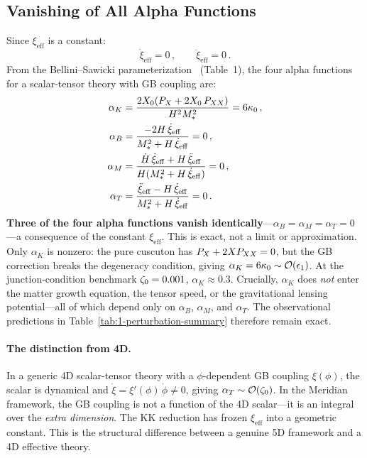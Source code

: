 \subsection{Vanishing of All Alpha Functions}
\label{sec:1-alphaT-vanish}

Since $\xi_{\mathrm{eff}}$ is a constant:
\begin{equation}
\label{eq:1-xi-derivatives}
\dot{\xi}_{\mathrm{eff}} = 0\,, \qquad \ddot{\xi}_{\mathrm{eff}} = 0\,.
\end{equation}
From the Bellini--Sawicki parameterization~\cite{ch1:bellini-sawicki} (Table~1), the four alpha functions for a scalar-tensor theory with GB coupling are:
\begin{subequations}
\label{eq:1-alphas-all}
\begin{align}
\alpha_K &= \frac{2X_0(P_X + 2X_0\,P_{XX})}{H^2 M_*^2} = 6\kappa_0\,, \label{eq:1-alphaK}\\
\alpha_B &= \frac{-2H\,\dot{\xi}_{\mathrm{eff}}}{M_*^2 + H\,\dot{\xi}_{\mathrm{eff}}} = 0\,, \label{eq:1-alphaB}\\
\alpha_M &= \frac{\dot{H}\,\dot{\xi}_{\mathrm{eff}} + H\,\ddot{\xi}_{\mathrm{eff}}}{H(M_*^2 + H\,\dot{\xi}_{\mathrm{eff}})} = 0\,, \label{eq:1-alphaM}\\
\alpha_T &= \frac{\ddot{\xi}_{\mathrm{eff}} - H\,\dot{\xi}_{\mathrm{eff}}}{M_*^2 + H\,\dot{\xi}_{\mathrm{eff}}} = 0\,. \label{eq:1-alphaT-eq}
\end{align}
\end{subequations}
\textbf{Three of the four alpha functions vanish identically}---$\alpha_B = \alpha_M = \alpha_T = 0$---a consequence of the constant $\xi_{\mathrm{eff}}$. This is exact, not a limit or approximation. Only $\alpha_K$ is nonzero: the pure cuscuton has $P_X + 2XP_{XX} = 0$, but the GB correction breaks the degeneracy condition, giving $\alpha_K = 6\kappa_0 \sim \mathcal{O}\!\left(\epsilon_1\right)$. At the junction-condition benchmark $\zeta_0 = 0.001$, $\alpha_K \approx 0.3$. Crucially, $\alpha_K$ does \emph{not} enter the matter growth equation, the tensor speed, or the gravitational lensing potential---all of which depend only on $\alpha_B$, $\alpha_M$, and $\alpha_T$. The observational predictions in Table~\ref{tab:1-perturbation-summary} therefore remain exact.

\paragraph{The distinction from 4D.} In a generic 4D scalar-tensor theory with a $\phi$-dependent GB coupling $\xi(\phi)$, the scalar is dynamical and $\dot{\xi} = \xi'(\phi)\,\dot{\phi} \neq 0$, giving $\alpha_T \sim \mathcal{O}\!\left(\zeta_0\right)$. In the Meridian framework, the GB coupling is not a function of the 4D scalar---it is an integral over the \emph{extra dimension}. The KK reduction has frozen $\xi_{\mathrm{eff}}$ into a geometric constant. This is the structural difference between a genuine 5D framework and a 4D effective theory.

